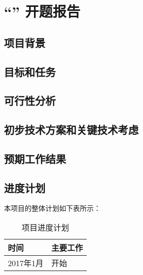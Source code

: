 \chapter*{``\zjutitlec'' 开题报告}

\section{项目背景}

\cite{article1}

\section{目标和任务}

\section{可行性分析}

\section{初步技术方案和关键技术考虑}

\section{预期工作结果}

\section{进度计划}

本项目的整体计划如下表所示：

\begin{table}[!htbp]
\centering
\begin{tabular}{|l|l|}
\hline
时间 & 主要工作 \\ \hline
2017年1月 & 开始 \\ \hline
\end{tabular}
\caption{项目进度计划}
\label{table:schedule}
\end{table}


{
\renewcommand{\chapter}[2]{\section*{#2}\addcontentsline{toc}{section}{#2}}

}

